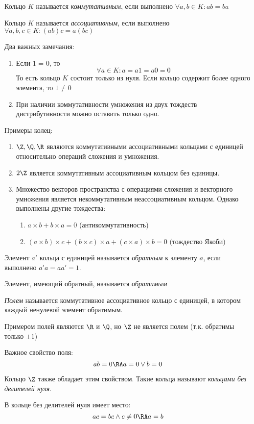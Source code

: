 \documentclass[a4paper, 14pt]{article}
\begin{document}
    \begin{definition}
        Кольцо $K$ называется {\it коммутативным}, если выполнено $\forall a, b \in K : ab = ba$
    \end{definition}
    \begin{definition}
        Кольцо $K$ называется {\it ассоциативным}, если выполнено $\forall a, b, c \in K : (ab)c = a(bc)$
    \end{definition}

    Два важных замечания:
    \begin{enumerate}
        \item Если 1 = 0, то
        \[\forall a \in K : a = a1 = a0 = 0\]
        То есть кольцо $K$ состоит только из нуля. Если кольцо содержит более одного элемента, то $1 \neq 0$

        \item При наличии коммутативности умножения из двух тождеств дистрибутивности
        можно оставить только одно.
    \end{enumerate}

    Примеры колец:
    \begin{enumerate}
        \item $\Z, \Q, \R$ являются коммутативными ассоциативными кольцами с единицей
        относительно операций сложения и умножения.
        \item $2\Z$ является коммутативным ассоциативным кольцом без единицы.
        \item Множество векторов пространства с операциями сложения и векторного умножения
        является некоммутативным неассоциативным кольцом. Однако выполнены другие тождества:
        \begin{enumerate}
            \item $a \times b + b \times a = 0$ (антикоммутативность)
            \item $(a \times b) \times c + (b \times c) \times a + (c \times a) \times b = 0$ (тождество Якоби)
        \end{enumerate} 
    \end{enumerate}
    
    \begin{definition}
        Элемент $a'$ кольца с единицей называется {\it обратным} к элементу $a$,
        если выполнено $a'a = aa' = 1$.

        Элемент, имеющий обратный, называется {\it обратимым}
    \end{definition}

    \begin{definition}
        {\it Полем} называется коммутативное ассоциативное кольцо с единицей,
        в котором каждый ненулевой элемент обратимым. 

        Примером полей являются $\R$ и $\Q$, но $\Z$ не является полем (т.к. обратимы только $\pm 1$)
    \end{definition}
    

    Важное свойство поля: \[ab = 0 \RA a = 0 \lor b = 0\]

    Кольцо $\Z$ также обладает этим свойством. Такие кольца называют 
    {\it кольцами без делителей нуля}.

    В кольце без делителей нуля имеет место:
    \[ac = bc \land c \neq 0 \RA a = b\]
    
\end{document}
